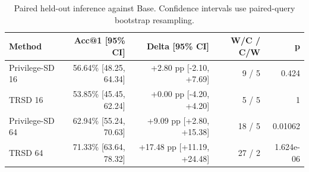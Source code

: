 \begin{table}[t]
\centering
\small
\caption{Paired held-out inference against Base. Confidence intervals use paired-query bootstrap resampling.}
\label{tab:trsd-paired-base}
\begin{tabular}{lrrrr}
\toprule
Method & Acc@1 [95\% CI] & Delta [95\% CI] & W/C / C/W & p \\
\midrule
Privilege-SD 16 & 56.64\% [48.25, 64.34] & +2.80 pp [-2.10, +7.69] & 9 / 5 & 0.424 \\
TRSD 16 & 53.85\% [45.45, 62.24] & +0.00 pp [-4.20, +4.20] & 5 / 5 & 1 \\
Privilege-SD 64 & 62.94\% [55.24, 70.63] & +9.09 pp [+2.80, +15.38] & 18 / 5 & 0.01062 \\
TRSD 64 & 71.33\% [63.64, 78.32] & +17.48 pp [+11.19, +24.48] & 27 / 2 & 1.624e-06 \\
\bottomrule
\end{tabular}
\end{table}

